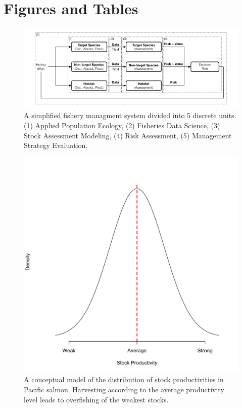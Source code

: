 \documentclass[]{scrartcl}
\author{}
\date{}
\begin{document}
\newpage

\section{Figures and Tables}\label{figures-and-tables}

\begin{figure}[htbp]
\centering
\includegraphics{figures/mscMSE.pdf}
\caption{A simplified fishery managment system divided into 5 discrete units. (1) Applied Population Ecology, (2) Fisheries Data Science, (3) Stock Assessment Modeling, (4) Risk Assessment, (5) Management Strategy Evaluation.}\label{fig:fishMgmt}
\end{figure}

\newpage

\begin{figure}[htbp]
\centering
\includegraphics{figures/WeakStrongDist.pdf}
\caption{A conceptual model of the distribution of stock productivities in Pacific salmon. Harvesting according to the average productivity level leads to overfishing of the weakest stocks.}\label{fig:ppHCR}
\end{figure}
\end{document}
